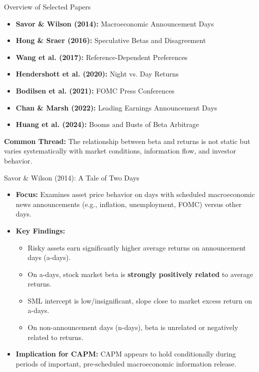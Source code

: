 \documentclass[10pt]{beamer}
\begin{document}
\begin{frame}{Overview of Selected Papers}
  \begin{itemize}
    \item \textbf{Savor \& Wilson (2014):} Macroeconomic Announcement Days
    \item \textbf{Hong \& Sraer (2016):} Speculative Betas and Disagreement
    \item \textbf{Wang et al. (2017):} Reference-Dependent Preferences
    \item \textbf{Hendershott et al. (2020):} Night vs. Day Returns
    \item \textbf{Bodilsen et al. (2021):} FOMC Press Conferences
    \item \textbf{Chan \& Marsh (2022):} Leading Earnings Announcement Days
    \item \textbf{Huang et al. (2024):} Booms and Busts of Beta Arbitrage
  \end{itemize}
  \bigskip
  \textbf{Common Thread:} The relationship between beta and returns is not static but varies systematically with market conditions, information flow, and investor behavior.
\end{frame}

\begin{frame}{Savor \& Wilson (2014): A Tale of Two Days}

  \begin{itemize}
    \item \textbf{Focus:} Examines asset price behavior on days with scheduled macroeconomic news announcements (e.g., inflation, unemployment, FOMC) versus other days.
    \item \textbf{Key Findings:}
    \begin{itemize}
        \item Risky assets earn significantly higher average returns on announcement days (a-days).
        \item On a-days, stock market beta is \textbf{strongly positively related} to average returns.
        \item SML intercept is low/insignificant, slope close to market excess return on a-days.
        \item On non-announcement days (n-days), beta is unrelated or negatively related to returns.
    \end{itemize}
    \item \textbf{Implication for CAPM:} CAPM appears to hold conditionally during periods of important, pre-scheduled macroeconomic information release.
  \end{itemize}
\end{frame}
\end{document}
